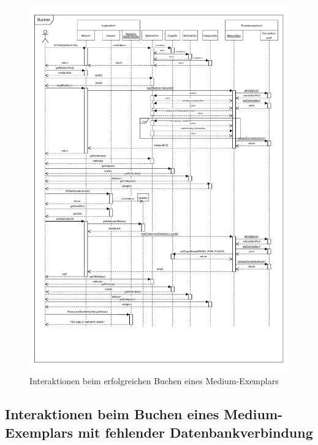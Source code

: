 \documentclass{article}
\begin{document}
\begin{figure}[h]
    \centering
    \includegraphics[width = 50em]{Sequenzdiagramm-success-v4.0}
    \caption{Interaktionen beim erfolgreichen Buchen eines Medium-Exemplars}
    \label{Sequenzdiagramm}
\end{figure}
\restoregeometry

\subsection{Interaktionen beim Buchen eines Medium-Exemplars mit fehlender Datenbankverbindung}
\end{document}
